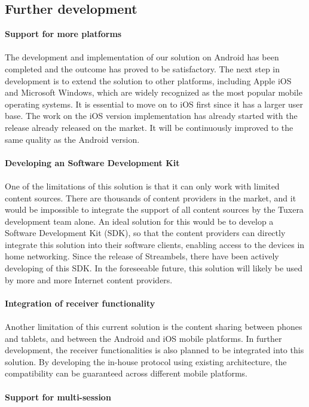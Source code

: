 \subsection{Further development\label{5_2}}
\textbf{Support for more platforms}\\
\\
The development and implementation of our solution on Android has been completed
and the outcome has proved to be satisfactory. The next step in development is
to extend the solution to other platforms, including Apple iOS and Microsoft
Windows, which are widely recognized as the most popular mobile operating
systems. It is essential to move on to iOS first since it has a larger user
base. The work on the iOS version implementation has already started with the
release already released on the market. It will be continuously improved to
the same quality as the Android version.\\
\\
\textbf{Developing an Software Development Kit}\\
\\
One of the limitations of this solution is that it can only work with limited
content sources. There are thousands of content providers in the market, and it
would be impossible to integrate the support of all content sources by the
Tuxera development team alone. An ideal solution for this would be to develop a
Software Development Kit (SDK), so that the content providers can directly
integrate this solution into their software clients, enabling access to the
devices in home networking. Since the release of Streambels, there have been
actively developing of this SDK. In the foreseeable future, this solution will
likely be used by more and more Internet content providers.\\
\\
\textbf{Integration of receiver functionality}\\
\\
Another limitation of this current solution is the content sharing between
phones and tablets, and between the Android and iOS mobile platforms.
In further development, the receiver functionalities is also planned to be
integrated into this solution. By developing the in-house protocol using
existing architecture, the compatibility can be guaranteed across different
mobile platforms.\\
\\
\textbf{Support for multi-session}\\
\\
